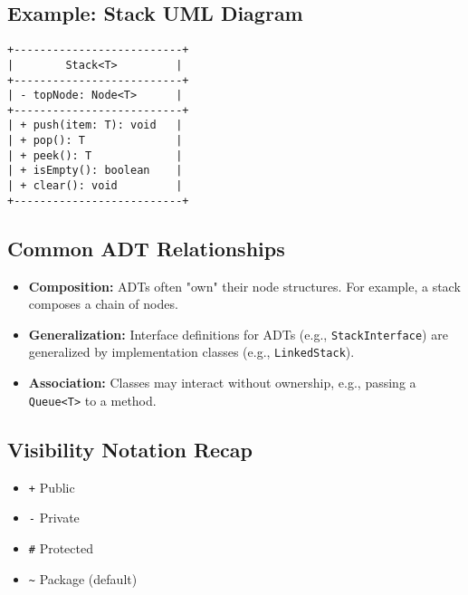 \documentclass[11pt]{article}
\begin{document}
\subsection*{Example: Stack UML Diagram}
\begin{verbatim}
+--------------------------+
|        Stack<T>         |
+--------------------------+
| - topNode: Node<T>      |
+--------------------------+
| + push(item: T): void   |
| + pop(): T              |
| + peek(): T             |
| + isEmpty(): boolean    |
| + clear(): void         |
+--------------------------+
\end{verbatim}

\subsection*{Common ADT Relationships}
\begin{itemize}
  \item \textbf{Composition:} ADTs often "own" their node structures. For example, a stack composes a chain of nodes.
  \item \textbf{Generalization:} Interface definitions for ADTs (e.g., \texttt{StackInterface}) are generalized by implementation classes (e.g., \texttt{LinkedStack}).
  \item \textbf{Association:} Classes may interact without ownership, e.g., passing a \texttt{Queue<T>} to a method.
\end{itemize}

\subsection*{Visibility Notation Recap}
\begin{itemize}
  \item \texttt{+} Public
  \item \texttt{-} Private
  \item \texttt{\#} Protected
  \item \texttt{\~{}} Package (default)
\end{itemize}
\end{document}
